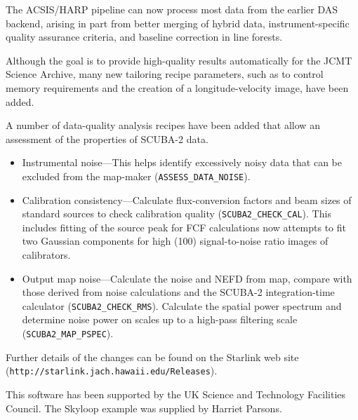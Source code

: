 \documentclass[11pt,twoside]{article}
\begin{document}
The ACSIS/HARP pipeline can now process most data from the earlier DAS
backend, arising in part from better merging of hybrid data,
instrument-specific quality assurance criteria, and baseline
correction in line forests.

Although the goal is to provide high-quality results automatically for
the JCMT Science Archive, many new tailoring recipe parameters, such
as to control memory requirements and the creation of a
longitude-velocity image, have been added.


A number of data-quality analysis recipes have been added that allow
an assessment of the properties of SCUBA-2 data.
\begin{itemize}
\item Instrumental noise---This helps identify excessively noisy data that
can be excluded from the map-maker (\texttt{ASSESS\_DATA\_NOISE}).
\item Calibration consistency---Calculate flux-conversion factors and beam
sizes of standard sources to check calibration quality
(\texttt{SCUBA2\_CHECK\_CAL}).  This includes fitting of the source peak
for FCF calculations now attempts to fit two Gaussian components for high
(100) signal-to-noise ratio images of calibrators.
\item Output map noise---Calculate the noise and NEFD from map,
compare with those derived from noise calculations and the SCUBA-2
integration-time calculator (\texttt{SCUBA2\_CHECK\_RMS}).  Calculate
the spatial power spectrum and determine noise power on scales up to a
high-pass filtering scale (\texttt{SCUBA2\_MAP\_PSPEC}).
\end{itemize}

Further details of the changes can be found on the Starlink
web site\newline
(\texttt{http://starlink.jach.hawaii.edu/Releases}).

\acknowledgments This software has been supported by the UK Science
and Technology Facilities Council.  The Skyloop example was supplied
by Harriet Parsons.


\end{document}
